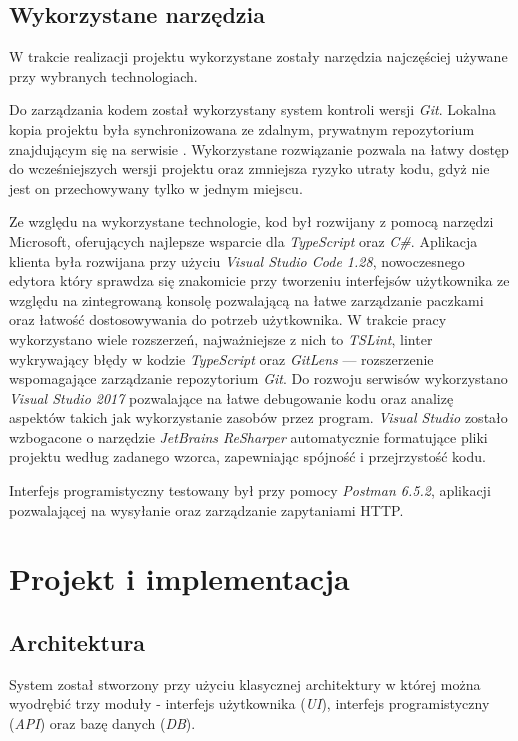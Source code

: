 \documentclass[eng,printmode,openany]{mgr}
\begin{document}
	\section{Wykorzystane narzędzia}
	W trakcie realizacji projektu wykorzystane zostały narzędzia najczęściej używane przy wybranych technologiach.
	
	Do zarządzania kodem został wykorzystany system kontroli wersji \textit{Git}. Lokalna kopia projektu była synchronizowana ze zdalnym, prywatnym repozytorium znajdującym się na serwisie . Wykorzystane rozwiązanie pozwala na łatwy dostęp do wcześniejszych wersji projektu oraz zmniejsza ryzyko utraty kodu, gdyż nie jest on przechowywany tylko w jednym miejscu.
	
	Ze względu na wykorzystane technologie, kod był rozwijany z pomocą narzędzi Microsoft, oferujących najlepsze wsparcie dla \textit{TypeScript} oraz \textit{C\#}. Aplikacja klienta była rozwijana przy użyciu \textit{Visual Studio Code 1.28}, nowoczesnego edytora który sprawdza się znakomicie przy tworzeniu interfejsów użytkownika ze względu na zintegrowaną konsolę pozwalającą na łatwe zarządzanie paczkami oraz łatwość dostosowywania do potrzeb użytkownika. W trakcie pracy wykorzystano wiele rozszerzeń, najważniejsze z nich to \textit{TSLint}, linter wykrywający błędy w kodzie \textit{TypeScript} oraz \textit{GitLens} — rozszerzenie wspomagające zarządzanie repozytorium \textit{Git}. Do rozwoju serwisów wykorzystano \textit{Visual Studio 2017} pozwalające na łatwe debugowanie kodu oraz analizę aspektów takich jak wykorzystanie zasobów przez program. \textit{Visual Studio} zostało wzbogacone o narzędzie \textit{JetBrains ReSharper} automatycznie formatujące pliki projektu według zadanego wzorca, zapewniając spójność i przejrzystość kodu.
	
	Interfejs programistyczny testowany był przy pomocy \textit{Postman 6.5.2}, aplikacji pozwalającej na wysyłanie oraz zarządzanie zapytaniami HTTP.
	
	\newpage
	\chapter{Projekt i implementacja}
	\section{Architektura}
	System został stworzony przy użyciu klasycznej architektury w której można wyodrębić trzy moduły - interfejs użytkownika (\textit{UI}), interfejs programistyczny (\textit{API}) oraz bazę danych (\textit{DB}). 
	
\end{document}
